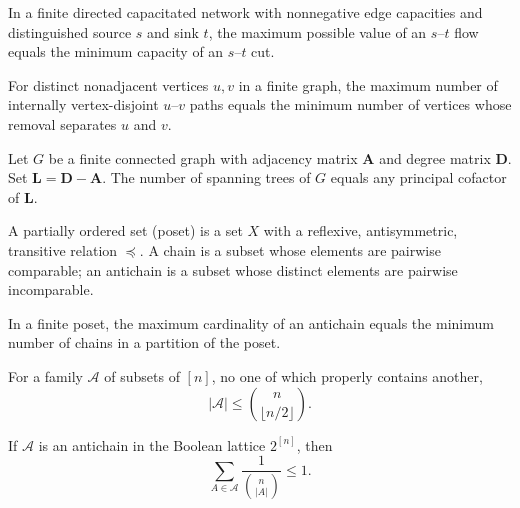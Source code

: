 \begin{theorem}
In a finite directed capacitated network with nonnegative edge capacities and distinguished source $s$ and sink $t$, the maximum possible value of an $s$--$t$ flow equals the minimum capacity of an $s$--$t$ cut.
\end{theorem}

\begin{theorem}
For distinct nonadjacent vertices $u, v$ in a finite graph, the maximum number of internally vertex-disjoint $u$--$v$ paths equals the minimum number of vertices whose removal separates $u$ and $v$.
\end{theorem}

\begin{theorem}
Let $G$ be a finite connected graph with adjacency matrix $\mathbf{A}$ and degree matrix $\mathbf{D}$. Set $\mathbf{L}=\mathbf{D}-\mathbf{A}$. The number of spanning trees of $G$ equals any principal cofactor of $\mathbf{L}$.
\end{theorem}

\begin{definition}
A partially ordered set (poset) is a set $X$ with a reflexive, antisymmetric, transitive relation $\preceq$. A chain is a subset whose elements are pairwise comparable; an antichain is a subset whose distinct elements are pairwise incomparable.
\end{definition}

\begin{theorem}
In a finite poset, the maximum cardinality of an antichain equals the minimum number of chains in a partition of the poset.
\end{theorem}

\begin{theorem}
For a family $\mathcal{A}$ of subsets of $[n]$, no one of which properly contains another,
\[
 |\mathcal{A}|\le\binom n{\lfloor n/2\rfloor}.
\]
\end{theorem}

\begin{theorem}
If $\mathcal{A}$ is an antichain in the Boolean lattice $2^{[n]}$, then
\[
 \sum_{A\in\mathcal{A}}\frac1{\binom n{|A|}}\le1.
\]
\end{theorem}

